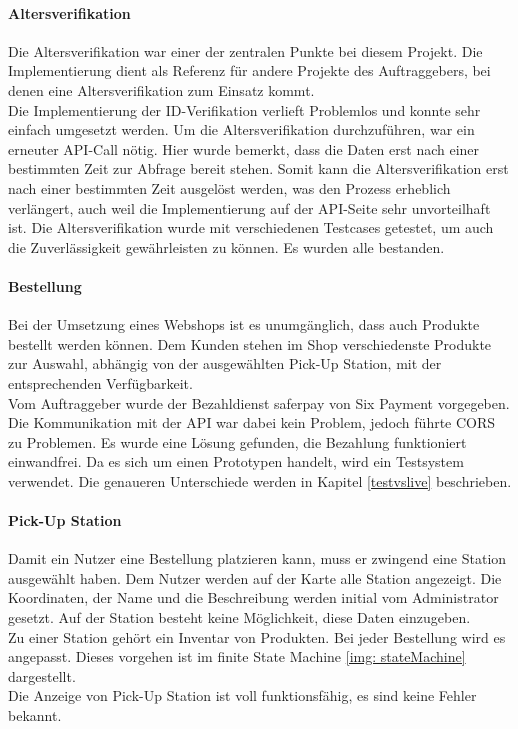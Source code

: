 \paragraph{Altersverifikation}
Die Altersverifikation war einer der zentralen Punkte bei diesem Projekt. Die Implementierung dient als Referenz für andere Projekte des Auftraggebers, bei denen eine Altersverifikation zum Einsatz kommt. \\
Die Implementierung der ID-Verifikation verlieft Problemlos und konnte sehr einfach umgesetzt werden. Um die Altersverifikation durchzuführen, war ein erneuter API-Call nötig. Hier wurde bemerkt, dass die Daten erst nach einer bestimmten Zeit zur Abfrage bereit stehen. Somit kann die Altersverifikation erst nach einer bestimmten Zeit ausgelöst werden, was den Prozess erheblich verlängert, auch weil die Implementierung auf der API-Seite sehr unvorteilhaft ist. Die Altersverifikation wurde mit verschiedenen Testcases getestet, um auch die Zuverlässigkeit gewährleisten zu können. Es wurden alle bestanden. 

\paragraph{Bestellung}
Bei der Umsetzung eines Webshops ist es unumgänglich, dass auch Produkte bestellt werden können. Dem Kunden stehen im Shop verschiedenste Produkte zur Auswahl, abhängig von der ausgewählten Pick-Up Station, mit der entsprechenden Verfügbarkeit. \\Vom Auftraggeber wurde der Bezahldienst saferpay von Six Payment vorgegeben. Die Kommunikation mit der API war dabei kein Problem, jedoch führte \ac{CORS} zu Problemen. Es wurde eine Lösung gefunden, die Bezahlung funktioniert einwandfrei. Da es sich um einen Prototypen handelt, wird ein Testsystem verwendet. Die genaueren Unterschiede werden in Kapitel \ref{testvslive} beschrieben. \\

\paragraph{Pick-Up Station}
Damit ein Nutzer eine Bestellung platzieren kann, muss er zwingend eine Station ausgewählt haben. Dem Nutzer werden auf der Karte alle Station angezeigt. Die Koordinaten, der Name und die Beschreibung werden initial vom Administrator gesetzt. Auf der Station besteht keine Möglichkeit, diese Daten einzugeben. \\Zu einer Station gehört ein Inventar von Produkten. Bei jeder Bestellung wird es angepasst. Dieses vorgehen ist im finite State Machine \ref{img: stateMachine} dargestellt.\\
Die Anzeige von Pick-Up Station ist voll funktionsfähig, es sind keine Fehler bekannt. 

